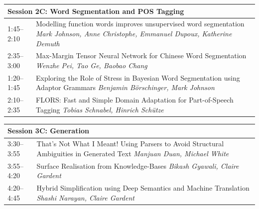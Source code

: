 \documentclass{book}
\renewcommand{\large}{\fontsize{36}{40}\selectfont}
\begin{document}
\begin{tabular}{p{3in}p{16in}}
  \multicolumn{2}{l}{\bfseries\large Session 2C: Word Segmentation and POS Tagging} \\\hline

    
    1:45--2:10
    &	Modelling function words improves unsupervised word segmentation \newline 
    {\itshape Mark Johnson, Anne Christophe, Emmanuel Dupoux, Katherine Demuth} \\
    
    2:35--3:00
    &	Max-Margin Tensor Neural Network for Chinese Word Segmentation \newline 
    {\itshape Wenzhe Pei, Tao Ge, Baobao Chang} \\
    
    1:20--1:45
    &	Exploring the Role of Stress in Bayesian Word Segmentation using Adaptor Grammars \newline 
    {\itshape Benjamin Börschinger, Mark Johnson} \\
    
    2:10--2:35
    &	FLORS: Fast and Simple Domain Adaptation for Part-of-Speech Tagging \newline 
    {\itshape Tobias Schnabel, Hinrich Schütze} \\
    
\end{tabular}

\begin{tabular}{p{3in}p{16in}}
  \multicolumn{2}{l}{\bfseries\large Session 3C: Generation} \\\hline

    
    3:30--3:55
    &	That's Not What I Meant! Using Parsers to Avoid Structural Ambiguities in Generated Text \newline 
    {\itshape Manjuan Duan, Michael White} \\
    
    3:55--4:20
    &	Surface Realisation from Knowledge-Bases \newline 
    {\itshape Bikash Gyawali, Claire Gardent} \\
    
    4:20--4:45
    &	Hybrid Simplification using Deep Semantics and Machine Translation \newline 
    {\itshape Shashi Narayan, Claire Gardent} \\
    
\end{tabular}
\end{document}
